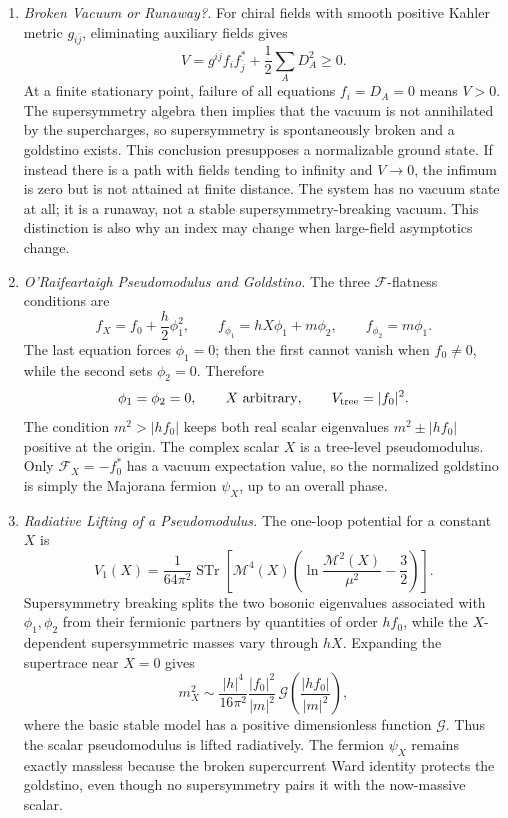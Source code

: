 \begin{enumerate}
  \begin{enumerate}
    \item \emph{Broken Vacuum or Runaway?.}
    For chiral fields with smooth positive Kahler metric \(g_{i\bar j}\),
      eliminating auxiliary fields gives
      \[
        V=g^{i\bar j}f_i f_{\bar j}^*
          +\frac12\sum_A D_A^2\geq0.
      \]
      At a finite stationary point, failure of all equations
      \(f_i=D_A=0\) means \(V>0\).  The supersymmetry algebra then implies
      that the vacuum is not annihilated by the supercharges, so
      supersymmetry is spontaneously broken and a goldstino exists.
      This conclusion presupposes a normalizable ground state.  If instead
      there is a path with fields tending to infinity and \(V\to0\), the
      infimum is zero but is not attained at finite distance.  The system
      has no vacuum state at all; it is a runaway, not a stable
      supersymmetry-breaking vacuum.  This distinction is also why an index
      may change when large-field asymptotics change.
    \item \emph{O'Raifeartaigh Pseudomodulus and Goldstino.}
    The three \(\mathcal F\)-flatness conditions are
      \[
        f_X=f_0+\frac h2\phi_1^2,\qquad
        f_{\phi_1}=hX\phi_1+m\phi_2,\qquad
        f_{\phi_2}=m\phi_1.
      \]
      The last equation forces \(\phi_1=0\); then the first cannot vanish
      when \(f_0\ne0\), while the second sets \(\phi_2=0\).  Therefore
      \[
        \phi_1=\phi_2=0,\qquad X\ {\rm arbitrary},\qquad
        V_{\rm tree}=\lvert f_0\rvert^2.
      \]
      The condition \(m^2>\lvert hf_0\rvert\) keeps both real scalar
      eigenvalues \(m^2\pm\lvert hf_0\rvert\) positive at the origin.
      The complex scalar \(X\) is a tree-level pseudomodulus.  Only
      \(\mathcal F_X=-f_0^*\) has a vacuum expectation value, so the
      normalized goldstino is simply the Majorana fermion \(\psi_X\), up to
      an overall phase.
    \item \emph{Radiative Lifting of a Pseudomodulus.}
    The one-loop potential for a constant \(X\) is
      \[
        V_1(X)=\frac{1}{64\pi^2}
          \operatorname{STr}\left[
           \mathcal M^4(X)
           \left(\ln\frac{\mathcal M^2(X)}{\mu^2}-\frac32\right)
          \right].
      \]
      Supersymmetry breaking splits the two bosonic eigenvalues associated
      with \(\phi_1,\phi_2\) from their fermionic partners by quantities of
      order \(hf_0\), while the \(X\)-dependent supersymmetric masses vary
      through \(hX\).  Expanding the supertrace near \(X=0\) gives
      \[
        m_X^2
          \sim\frac{\lvert h\rvert^4}{16\pi^2}
           \frac{\lvert f_0\rvert^2}{\lvert m\rvert^2}
           \,\mathcal G\!\left(
            \frac{\lvert hf_0\rvert}{\lvert m\rvert^2}
           \right),
      \]
      where the basic stable model has a positive dimensionless function
      \(\mathcal G\).  Thus the scalar pseudomodulus is lifted
      radiatively.  The fermion \(\psi_X\) remains exactly massless because
      the broken supercurrent Ward identity protects the goldstino, even
      though no supersymmetry pairs it with the now-massive scalar.
  \end{enumerate}


\end{enumerate}
